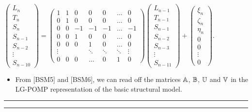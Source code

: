 \documentclass[]{article}
\providecommand{\tightlist}{%
  \setlength{\itemsep}{0pt}\setlength{\parskip}{0pt}}
\begin{document}
\(\displaystyle  \left(\begin{array}{l} L_{n} \\ T_{n} \\ S_{n} \\ S_{n-1}\\ S_{n-2} \\  \vdots \\ S_{n-10} \end{array}\right) = \left(\begin{array}{ccccccc} 1 & 1 & 0 & 0 & 0 & \ldots & 0 \\ 0 & 1 & 0 & 0 & 0 & \ldots & 0 \\ 0 & 0 & -1 & -1 & -1 & \ldots & -1\\ 0 & 0 & 1 & 0 & 0 & \ldots & 0 \\ 0 & 0 & 0 & 1 & 0 & \ldots & 0 \\ \vdots & & &\ddots & \ddots & \ddots & \vdots \\ 0 & 0 & 0 &\ldots & 0 & 1 & 0 \end{array}\right) \left(\begin{array}{l} L_{n-1} \\ T_{n-1} \\ S_{n-1} \\ S_{n-2}\\ S_{n-3} \\  \vdots \\ S_{n-11} \end{array}\right) + \left(\begin{array}{l} \xi_n \\ \zeta_n \\ \eta_n \\ 0 \\ 0 \\  \vdots \\ 0 \end{array}\right).\)

\begin{itemize}
\tightlist
\item
  From {[}BSM5{]} and {[}BSM6{]}, we can read off the matrices
  \(\mathbb{A}\), \(\mathbb{B}\), \(\mathbb{U}\) and \(\mathbb{V}\) in the LG-POMP
  representation of the basic structural model.
\end{itemize}

\begin{center}\rule{0.5\linewidth}{\linethickness}\end{center}

\begin{center}\rule{0.5\linewidth}{\linethickness}\end{center}
\end{document}
